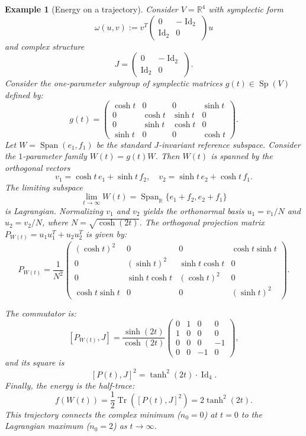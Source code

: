 \documentclass[12pt, final]{article}
\def\R{\mathbb{R}}
\def\Span{\operatorname{Span}}
\def\Sp{\operatorname{Sp}}
\def\Tr{\operatorname{Tr}}
\def\Id{\operatorname{Id}}
\newtheorem*{example}{Example}
\begin{document}
\begin{example}[Energy on a trajectory]
Consider $V = \R^4$ with symplectic form
\[ \omega(u, v):= v^T \begin{pmatrix} 0 & -\Id_2 \\ \Id_2 & 0 \end{pmatrix} u\]
and complex structure
\[ J = \begin{pmatrix} 0 & -\Id_2 \\ \Id_2 & 0 \end{pmatrix}. \]
Consider the one-parameter subgroup of symplectic matrices $g(t) \in \Sp(V)$ defined by:
\[
g(t) = \begin{pmatrix}
\cosh t & 0 & 0 & \sinh t \\
0 & \cosh t & \sinh t & 0 \\
0 & \sinh t & \cosh t & 0 \\
\sinh t & 0 & 0 & \cosh t
\end{pmatrix}.
\]
Let $W = \Span(e_1, f_1)$ be the standard $J$-invariant reference subspace. Consider the $1$-parameter family $W(t) = g(t)W$. 
Then $W(t)$ is spanned by the orthogonal vectors
\[
v_1 = \cosh t \, e_1 + \sinh t \, f_2, \quad v_2 = \sinh t \, e_2 + \cosh t \, f_1.
\]
The limiting subspace
\[ \lim_{t \to \infty} W(t) = \Span_\R\{ e_1 + f_2, e_2 + f_1\} \]
is Lagrangian.
Normalizing $v_1$ and $v_2$ yields the orthonormal basis $u_1 = v_1/N$ and $u_2 = v_2/N$, where $N = \sqrt{\cosh(2t)}$.
The orthogonal projection matrix $P_{W(t)} = u_1 u_1^T + u_2 u_2^T$ is given by:
\[
P_{W(t)} = \frac{1}{N^2} \begin{pmatrix}
(\cosh t)^2 & 0 & 0 & \cosh t \sinh t \\
0 & (\sinh t)^2 & \sinh t \cosh t & 0 \\
0 & \sinh t \cosh t & (\cosh t)^2 & 0 \\
\cosh t \sinh t & 0 & 0 & (\sinh t)^2
\end{pmatrix}.
\]

The commutator is:
\[
[P_{W(t)}, J] = \frac{\sinh(2t)}{\cosh(2t)} \begin{pmatrix}
0 & 1 & 0 & 0 \\
1 & 0 & 0 & 0 \\
0 & 0 & 0 & -1 \\
0 & 0 & -1 & 0
\end{pmatrix},
\]
and its square is
\[
[P(t), J]^2 = \tanh^2(2t) \cdot \Id_4.
\]
Finally, the energy is the half-trace:
\[
f(W(t)) = \frac{1}{2} \Tr \left( [P(t), J]^2 \right) = 2 \tanh^2(2t).
\]
This trajectory connects the complex minimum ($n_0 = 0$) at $t=0$ to the Lagrangian maximum ($n_0 = 2$) as $t \to \infty$.
\end{example}
\end{document}
